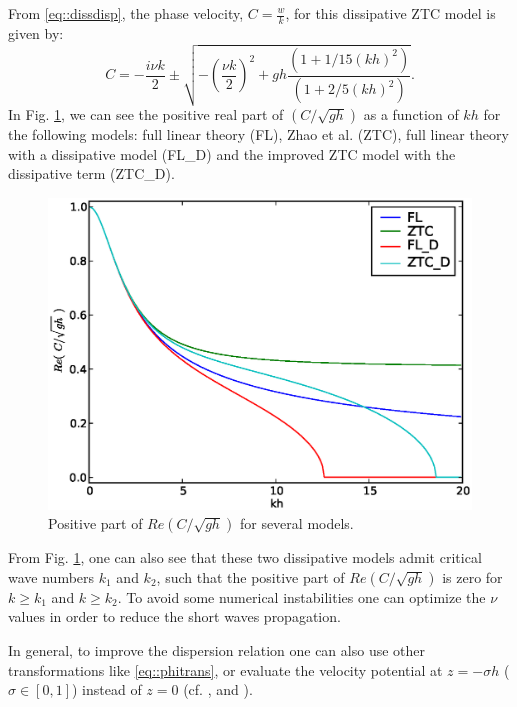 From \eqref{eq::dissdisp}, the 
 phase velocity, \(\displaystyle C=\frac{w}{k}\),  for this dissipative ZTC model is 
 given by:
\begin{equation}
C=-\frac{i\nu k}{2}\pm\sqrt{-\left(\frac{\nu k}{2}\right)^2+gh\frac{(1+1/15(kh)^2)}{(1+2/5(kh)^2)}}.
\end{equation}
In Fig. \ref{fig::dispersion}, we can see the positive real
part 
of \(\displaystyle\left(C/\sqrt{gh}\right)\) as a function of \(kh\) for the following models:
  full linear theory (FL), 
Zhao et al. (ZTC), full linear theory with a 
dissipative model (FL\_D) and the
improved  ZTC model with the dissipative term (ZTC\_D).
  \begin{figure}[!htb]
{\centering 
\includegraphics[width=12cm]{chapters/lopes/eps/dispersion.eps}
\caption{Positive  part of \(\displaystyle Re\left(C/\sqrt{gh}\right)\) for several models.}
\label{fig::dispersion}\par}
\end{figure}
From Fig. \ref{fig::dispersion}, one can also see that
  these two dissipative models  admit
critical wave numbers \(k_1\) and \(k_2\), 
such that the positive  part of \(\displaystyle Re\left(C/\sqrt{gh}\right)\) is zero
for \(k\geq k_1\) and \(k\geq k_2\). 
To avoid some numerical instabilities one can optimize
 the \(\nu\) values in order 
 to reduce  the short waves propagation.
  

In general, to improve the dispersion relation one can also use other
 transformations like \eqref{eq::phitrans}, or evaluate the
 velocity potential at \(z=-\sigma h\) (\(\sigma\in[0,1]\))
 instead of  \(z=0\) (cf. \cite{BinMad08}, \cite{MadAgn03} and \cite{MadBin03}).  


